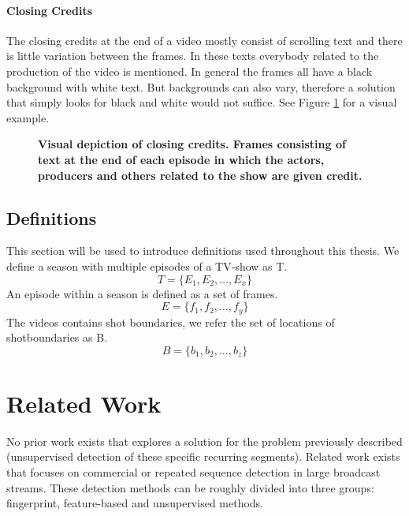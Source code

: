 \documentclass{report}
\begin{document}
\subsubsection{Closing Credits}
The closing credits at the end of a video mostly consist of scrolling text and there is little variation between the frames. In these texts everybody related to the production of the video is mentioned. In general the frames all have a black background with white text. But backgrounds can also vary, therefore a solution that simply looks for black and white would not suffice. See Figure \ref{fig:contextclosingcredits} for a visual example.

\begin{figure}[H]
	\caption{\textbf{Visual depiction of closing credits. Frames consisting of text at the end of each episode in which the actors, producers and others related to the show are given credit.}}
	\label{fig:contextclosingcredits}
\end{figure}

\section{Definitions}
This section will be used to introduce definitions used throughout this thesis. We define a season with multiple episodes of a TV-show as T.
\[T = \{E_1, E_2, \dots, E_x\}\]
An episode within a season is defined as a set of frames.
\[E = \{f_1, f_2, \dots, f_y\}\]
The videos contains shot boundaries, we refer the set of locations of shotboundaries as B.
\[B = \{b_1, b_2, \dots, b_z\}\]

\chapter{Related Work} \label{relatedwork}

No prior work exists that explores a solution for the problem previously described (unsupervised detection of these specific recurring segments). Related work exists that focuses on commercial or repeated sequence detection in large broadcast streams. These detection methods can be roughly divided into three groups: fingerprint, feature-based and unsupervised methods. 
\end{document}
